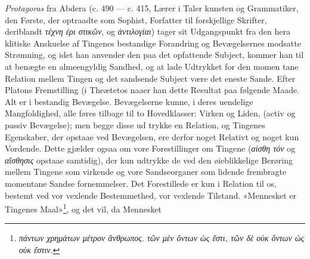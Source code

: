 \documentclass[12pt,a4paper]{book}
\newcommand{\gk}[1]{\textit{#1}}
\begin{document}
\emph{Protagoras} fra Abdera (c. 490 --- c. 415, Lærer i Taler\-%
kunsten og Grammatiker, den Første, der optraadte som
Sophist, Forfatter til forskjellige Skrifter, deriblandt \gk{τέχνη ἐρι\-%
στικῶν}, og \gk{ἀντιλογίαι}) tager sit Udgangspunkt fra den hera\-%
klitiske Anskuelse af Tingenes bestandige Forandring og
Bevægelsernes modsatte Strømning, og idet han anvender den
paa det opfattende Subject, kommer han til at benægte en
almeengyldig Sandhed, og at lade Udtrykket for den momen\-%
tane Relation mellem Tingen og det sandsende Subject være
det eneste Sande. Efter Platons Fremstilling (i Theætetos
naaer han dette Resultat paa følgende Maade. Alt er i
bestandig Bevægelse. Bevægelserne kunne, i deres uendelige
Mangfoldighed, alle føres tilbage til to Hovedklasser: Virken
og Liden, (activ og passiv Bevægelse); men begge disse ud\-%
trykke en Relation, og Tingenes Egenskaber, der opstaae ved
Bevægelsen, ere derfor noget Relativt og noget kun Vordende.
Dette gjælder ogsaa om vore Forestillinger om Tingene (\gk{αἰσθη\-%
τόν} og \gk{αἴσθησις} opstaae samtidig), der kun udtrykke de ved
den øieblikkelige Berøring mellem Tingene som virkende og
vore Sandseorganer som lidende frembragte momentane Sandse\-%
fornemmelser. Det Forestillede er kun i Relation til os,
bestemt ved vor vexlende Bestemmethed, vor vexlende Tilstand.
«Mennesket er Tingenes Maal»\footnote{\gk{πάντων χρημάτων μέτρον ἄνθρωπος}. \gk{τῶν μὲν ὄντων ὡς ἔστι, τῶν δὲ οὐκ ὄντων ὡς οὐκ ἔστιν}.}, og det vil, da Mennesket
%
%
%
\end{document}
